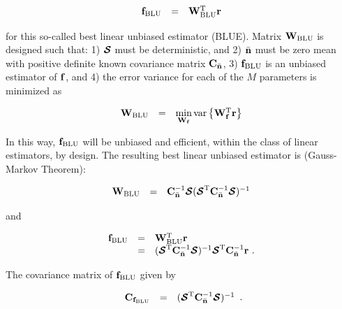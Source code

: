 \documentclass[a4paper,11pt,fleqn]{article}
\newcommand{\br}{{\mathbf r}}
\newcommand{\bC}{{\bf C}}
\newcommand{\bn}{{\bf n}}
\newcommand{\bbf}{{\bf f}}
\newcommand{\bW}{{\bf W}}
\newcommand{\bcS}{{\mbox {\boldmath ${\cal S}$}}}
\begin{document}
\begin{equation}
\begin{array}{rcl}
{\bbf}_{\rm BLU}&=&\bW_{\rm BLU}^{\rm T}\br
\end{array}
\end{equation}

\noindent for this so-called best linear unbiased estimator
(BLUE). Matrix $\bW_{\rm BLU}$ is designed such that: 1) $\bcS$
must be deterministic, and 2) $\bar{\bn}$ must be zero mean with
positive definite known covariance matrix $\bC_{\bar{\bn}}$, 3)
${\bbf}_{\rm BLU}$ is an unbiased estimator of $\bbf$, and 4) the
error variance for each of the $M$ parameters is minimized as

\begin{equation}
\begin{array}{rcl}
\bW_{\rm BLU}&=&\min\limits_{\bW_{\bbf}}
\mbox{var}\left\{\bW_{\bbf}^{\rm T}\br\right\}
\end{array}
\end{equation}

In this way, ${\bbf}_{\rm BLU}$ will be unbiased and efficient,
within the class of linear estimators, by design. The resulting
best linear unbiased estimator is (Gauss-Markov Theorem):

\begin{equation}
\begin{array}{rcl}
{\bW}_{\rm BLU}&=&\bC_{\bar{\bn}}^{-1}\bcS(\bcS^{\rm
T}\bC_{\bar{\bn}}^{-1}\bcS)^{-1}
\end{array}
\end{equation}

\noindent and

\begin{equation}
\begin{array}{rcl}
{\bbf}_{\rm BLU}&=&\bW_{\rm BLU}^{\rm T}\br\\
 &=&(\bcS^{\rm
T}\bC_{\bar{\bn}}^{-1}\bcS)^{-1}\bcS^{\rm
T}\bC_{\bar{\bn}}^{-1}\br\ .
\end{array} \label{BLUE}
\end{equation}

\noindent The covariance matrix of ${\bbf}_{\rm BLU}$ given by

\begin{equation}
\begin{array}{rcl}
{\bC}_{\bbf_{\rm BLU}}&=&(\bcS^{\rm
T}\bC_{\bar{\bn}}^{-1}\bcS)^{-1}
\end{array}.
\end{equation}
\end{document}
